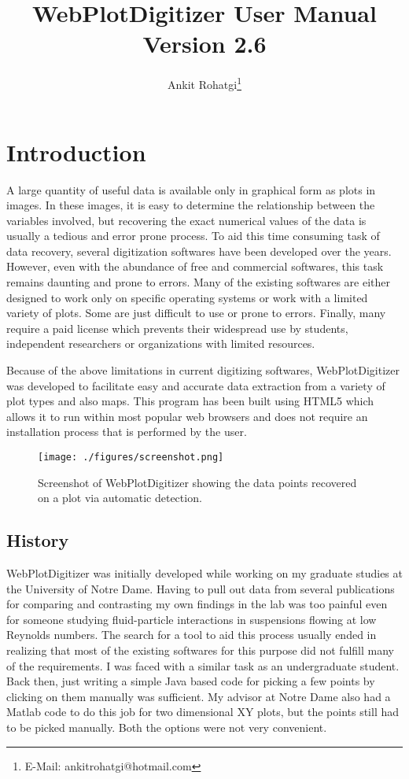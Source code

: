 \documentclass[letterpaper, 10pt]{article}
\begin{document}
\title{WebPlotDigitizer User Manual\\ Version 2.6}
\author{Ankit Rohatgi\footnote{E-Mail: ankitrohatgi@hotmail.com}}
\maketitle
\tableofcontents
\newpage
\section{Introduction}
A large quantity of useful data is available only in graphical form as plots in images. In these images, it is easy to determine the relationship between the variables involved, but recovering the exact numerical values of the data is usually a tedious and error prone process. To aid this time consuming task of data recovery, several digitization softwares have been developed over the years. However, even with the abundance of free and commercial softwares, this task remains daunting and prone to errors. Many of the existing softwares are either designed to work only on specific operating systems or work with a limited variety of plots. Some are just difficult to use or prone to errors. Finally, many require a paid license which prevents their widespread use by students, independent researchers or organizations with limited resources.

Because of the above limitations in current digitizing softwares, WebPlotDigitizer was developed to facilitate easy and accurate data extraction from a variety of plot types and also maps. This program has been built using HTML5 which allows it to run within most popular web browsers and does not require an installation process that is performed by the user.

\begin{figure}
\begin{center}
\texttt{[image: ./figures/screenshot.png]}
\caption{Screenshot of WebPlotDigitizer showing the data points recovered on a plot via automatic detection.}
\end{center}
\end{figure}

\subsection{History}
WebPlotDigitizer was initially developed while working on my graduate studies at the University of Notre Dame. Having to pull out data from several publications for comparing and contrasting my own findings in the lab was too painful even for someone studying fluid-particle interactions in suspensions flowing at low Reynolds numbers. The search for a tool to aid this process usually ended in realizing that most of the existing softwares for this purpose did not fulfill many of the requirements. I was faced with a similar task as an undergraduate student. Back then, just writing a simple Java based code for picking a few points by clicking on them manually was sufficient. My advisor at Notre Dame also had a Matlab code to do this job for two dimensional XY plots, but the points still had to be picked manually. Both the options were not very convenient.
\end{document}

